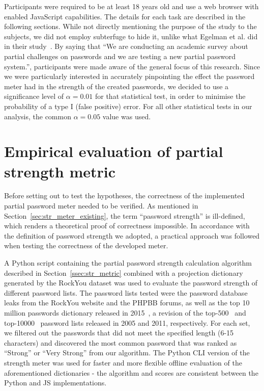 Participants were required to be at least 18 years old and use a web browser with enabled JavaScript capabilities. The details for each task are described in the following sections. While not directly mentioning the purpose of the study to the subjects, we did not employ subterfuge to hide it, unlike what Egelman et al. did in their study~\cite{strength_meter_impact}. By saying that ``We are conducting an academic survey about partial challenges on passwords and we are testing a new partial password system.'', participants were made aware of the general focus of this research. Since we were particularly interested in accurately pinpointing the effect the password meter had in the strength of the created passwords, we decided to use a significance level of $\alpha = 0.01$ for that statistical test, in order to minimise the probability of a type I (false positive) error. For all other statistical tests in our analysis, the common $\alpha = 0.05$ value was used.


\section{Empirical evaluation of partial strength metric}
  \label{sec:correctness}
  Before setting out to test the hypotheses, the correctness of the implemented partial password meter needed to be verified. As mentioned in Section~\ref{sec:str_meter_existing}, the term ``password strength'' is ill-defined, which renders a theoretical proof of correctness impossible. In accordance with the definition of password strength we adopted, a practical approach was followed when testing the correctness of the developed meter.

  A Python script containing the partial password strength calculation algorithm described in Section~\ref{ssec:str_metric} combined with a projection dictionary generated by the RockYou dataset was used to evaluate the password strength of different password lists. The password lists tested were the password database leaks from the RockYou website and the PHPBB forums, as well as the top 10 million passwords dictionary released in 2015~\cite{top10m_pass}, a revision of the top-500~\cite{top500_pass} and top-10000~\cite{top10000_pass} password lists released in 2005 and 2011, respectively. For each set, we filtered out the passwords that did not meet the specified length (6-15 characters) and discovered the most common password that was ranked as ``Strong'' or ``Very Strong'' from our algorithm. The Python CLI version of the strength meter was used for faster and more flexible offline evaluation of the aforementioned dictionaries - the algorithm and scores are consistent between the Python and JS implementations.


